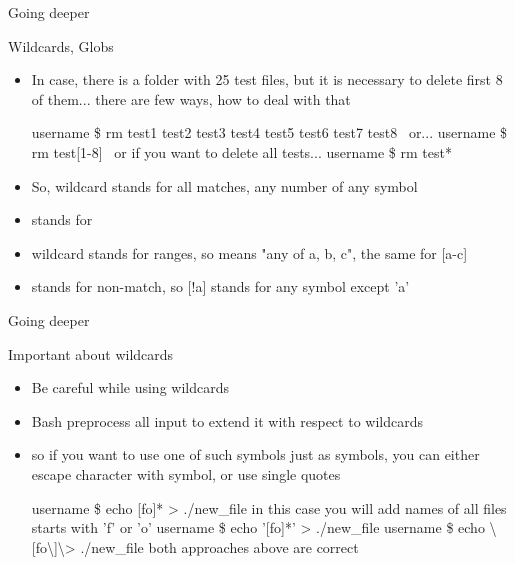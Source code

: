 \documentclass[usenames,dvipsnames,10pt,aspectratio=169]{beamer}
\begin{document}
\begin{frame}{Going deeper}

    {\Large Wildcards, Globs}
    \begin{itemize}
        \item In case, there is a folder with 25 test files, but it is necessary to delete first 8 of them... there are few ways, how to deal with that
        \begin{examples}
        username \$ rm test1 test2 test3 test4 test5 test6 test7 test8 \newline
        \,\,\,or... \newline
        username \$ rm test[1-8] \newline
        \,\,\,or if you want to delete all tests... \newline
        username \$ rm test*
        \end{examples}
        \item So, \ex{*} wildcard stands for all matches, any number of any symbol
        \item {} stands for 
        \item \ex{[]} wildcard stands for ranges, so \ex{[abc]} means "any of a, b, c", the same for [a-c]
        \item \ex{!} stands for non-match, so [!a] stands for any symbol except 'a'
    \end{itemize}
\end{frame}

\begin{frame}{Going deeper}

    {\Large Important about wildcards}
    \begin{itemize}
        \item Be careful while using wildcards
        \item Bash preprocess all input to extend it with respect to wildcards
        \item so if you want to use one of such symbols just as symbols, you can either escape character with \ex{\textbackslash} symbol, or use single quotes
        \begin{examples}
        username \$ echo [fo]* > ./new\_file \newline in this case you will add names of all files starts with 'f' or 'o' \newline
        username \$ echo '[fo]*' > ./new\_file\newline
        username \$ echo \textbackslash [fo\textbackslash ]\textbackslash * > ./new\_file \newline
        both approaches above are correct
        \end{examples}
    \end{itemize}
\end{frame}
\end{document}
